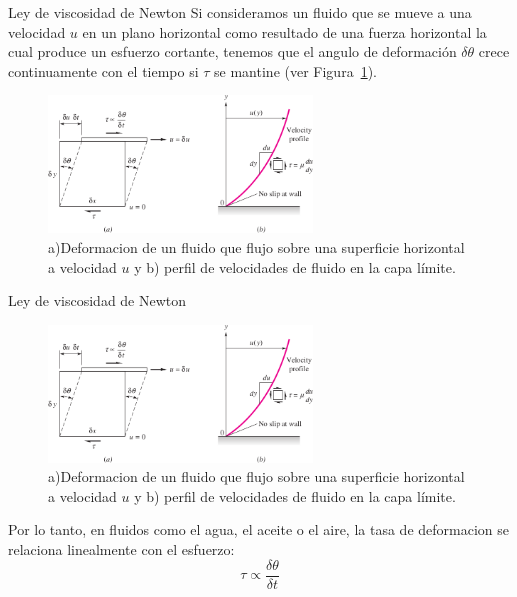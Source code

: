 \documentclass [xcolor=svgnames, t] {beamer}
\begin{document}
\begin{frame}{Ley de viscosidad de Newton}
Si consideramos un fluido que se mueve a una velocidad $u$ en un plano horizontal como resultado de una fuerza horizontal la cual produce un esfuerzo cortante, tenemos que el angulo de deformaci\'on $\delta \theta$ crece continuamente con el tiempo si $\tau$ se mantine (ver Figura~\ref{visco}).

\begin{figure}[h]
\centering
\includegraphics[width=7cm]{visco}
\caption{a)Deformacion de un fluido que flujo sobre una superficie horizontal a velocidad $u$ y  b) perfil de velocidades de fluido en la capa l\'imite.}
\label{visco}
\end{figure}

\end{frame}

\begin{frame}{Ley de viscosidad de Newton}
\vspace{-0.4cm}
\begin{figure}[h]
\centering
\includegraphics[width=7cm]{visco}
\caption{a)Deformacion de un fluido que flujo sobre una superficie horizontal a velocidad $u$ y  b) perfil de velocidades de fluido en la capa l\'imite.}
\end{figure}

Por lo tanto, en fluidos como el agua, el aceite o el aire, la tasa de deformacion se relaciona linealmente con el esfuerzo:
\begin{equation}
\tau \propto \frac{\delta \theta}{\delta t}
\label{vis1}
\end{equation}
\end{frame}
\end{document}
